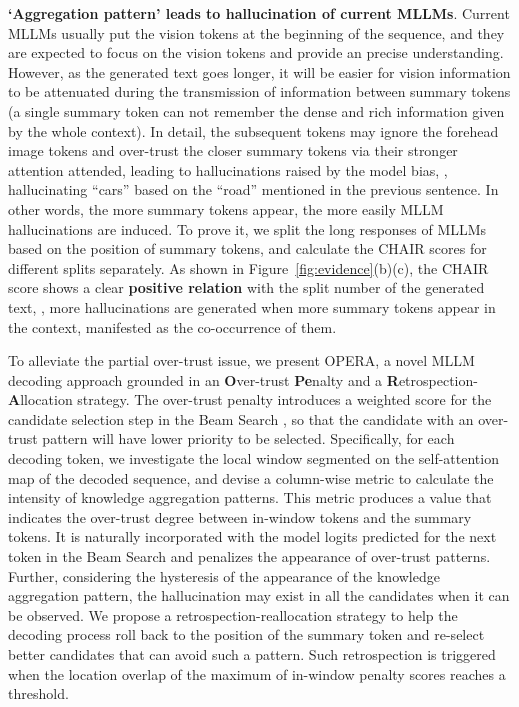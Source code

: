 \documentclass[10pt,twocolumn,letterpaper]{article}
\newcommand{\Fref}[1]{Figure~\ref{#1}}
\begin{document}
\textbf{`Aggregation pattern' leads to hallucination of current MLLMs}. 
Current MLLMs usually put the vision tokens at the beginning of the sequence, and they are expected to focus on the vision tokens and provide an precise understanding. 
However, as the generated text goes longer, it will be easier for vision information to be attenuated during the transmission of information between summary tokens (a single summary token can not remember the dense and rich information given by the whole context).
In detail, the subsequent tokens may ignore the forehead image tokens and over-trust the closer summary tokens via their stronger attention attended, leading to hallucinations raised by the model bias, \eg, hallucinating ``cars'' based on the ``road'' mentioned in the previous sentence. 
In other words, the more summary tokens appear, the more easily MLLM hallucinations are induced. 
To prove it, we split the long responses of MLLMs based on the position of summary tokens, and calculate the CHAIR scores for different splits separately. 
As shown in \Fref{fig:evidence}(b)(c), the CHAIR score shows a clear \textbf{positive relation} with the split number of the generated text, \ie, more hallucinations are generated when more summary tokens appear in the context, manifested as the co-occurrence of them. 


To alleviate the partial over-trust issue, we present OPERA, a novel MLLM decoding approach grounded in an \textbf{O}ver-trust \textbf{Pe}nalty and a \textbf{R}etrospection-\textbf{A}llocation strategy. 
The over-trust penalty introduces a weighted score for the candidate selection step in the Beam Search \cite{graves2012sequence,sutskever2014sequence,boulanger2013audio}, so that the candidate with an over-trust pattern will have lower priority to be selected.
Specifically, for each decoding token, we investigate the local window segmented on the self-attention map of the decoded sequence, and devise a column-wise metric to calculate the intensity of knowledge aggregation patterns. 
This metric produces a value that indicates the over-trust degree between in-window tokens and the summary tokens. 
It is naturally incorporated with the model logits predicted for the next token in the Beam Search and penalizes the appearance of over-trust patterns. 
Further, considering the hysteresis of the appearance of the knowledge aggregation pattern,  the hallucination may exist in all the candidates when it can be observed. We propose a retrospection-reallocation strategy to help the decoding process roll back to the position of the summary token and re-select better candidates that can avoid such a pattern.  
Such retrospection is triggered when the location overlap of the maximum of in-window penalty scores reaches a threshold. 
\end{document}
